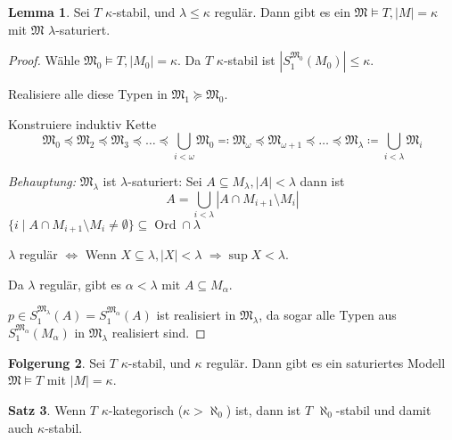\documentclass[12pt,parskip=full]{scrartcl}
\newcommand{\abs}[1]{{\left| #1 \right|}}
\theoremstyle{definition}
\newtheorem{theorem}{Satz}[section]
\newtheorem{corollary}[theorem]{Folgerung}
\newtheorem{lemma}[theorem]{Lemma}
\begin{document}
 	\begin{lemma}
 		Sei $T$ $\kappa$-stabil, und $\lambda \leq \kappa$ regulär. Dann gibt es ein $\mathfrak{M} \models T, \abs{M} = \kappa$ mit $\mathfrak{M}$ $\lambda$-saturiert.
 	\end{lemma}
 
 	\begin{proof}
 		Wähle $\mathfrak{M}_0 \models T, \abs{M_0} = \kappa$. Da $T$ $\kappa$-stabil ist $\abs{S_1^{\mathfrak{M}_0} (M_0)} \leq \kappa$.
 		
 		Realisiere alle diese Typen in $\mathfrak{M}_1 \succcurlyeq \mathfrak{M}_0$.
 		
 		Konstruiere induktiv Kette
 		\begin{equation*}
	 		\mathfrak{M}_0 \preccurlyeq \mathfrak{M}_2 \preccurlyeq \mathfrak{M}_3 \preccurlyeq \dots \preccurlyeq \bigcup_{i < \omega} \mathfrak{M_0} \eqqcolon \mathfrak{M}_\omega \preccurlyeq \mathfrak{M}_{\omega + 1} \preccurlyeq \dots \preccurlyeq \mathfrak{M}_\lambda \coloneqq \bigcup_{i < \lambda} \mathfrak{M}_i
 		\end{equation*}
 		
 		\textit{Behauptung:} $\mathfrak{M}_\lambda$ ist $\lambda$-saturiert: Sei $A \subseteq M_\lambda, \abs{A} < \lambda$ dann ist
 		\begin{equation*}
	 		A = \bigcup_{i < \lambda} \abs{A \cap M_{i+1} \setminus M_i}
 		\end{equation*}
 		$\{ i \mid A \cap M_{i+1} \setminus M_i \neq \emptyset \} \subseteq \operatorname{Ord} \cap \lambda$
 		
 		$\lambda$ regulär $\Leftrightarrow$ Wenn $X \subseteq \lambda, \abs{X} < \lambda$ $\Rightarrow \sup X < \lambda$.
 		
 		Da $\lambda$ regulär, gibt es $\alpha < \lambda$ mit $A \subseteq M_\alpha$.
 		
		$p \in S_1^{\mathfrak{M}_\lambda}(A) = S_1^{\mathfrak{M}_\alpha}(A)$ ist realisiert in $\mathfrak{M}_\lambda$, da sogar alle Typen aus $S_1^{\mathfrak{M}_\alpha}(M_\alpha)$ in $\mathfrak{M}_\lambda$ realisiert sind.
 	\end{proof}
 
 	\begin{corollary}
 		Sei $T$ $\kappa$-stabil, und $\kappa$ regulär. Dann gibt es ein saturiertes Modell $\mathfrak{M} \models T$ mit $\abs{M} = \kappa$.
 	\end{corollary}
 
 	\begin{theorem}
 		Wenn $T$ $\kappa$-kategorisch ($\kappa > \aleph_0$) ist, dann ist $T$ $\aleph_0$-stabil und damit auch $\kappa$-stabil.
 	\end{theorem}
 
\end{document}
